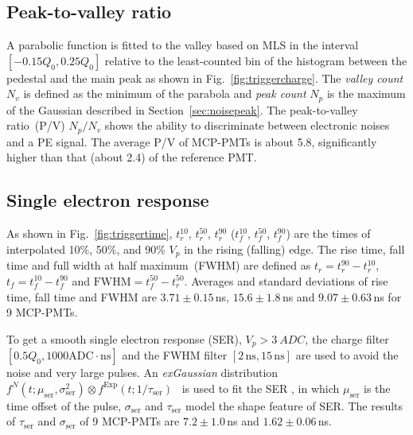 \subsection{Peak-to-valley ratio}
A parabolic function is fitted to the valley based on MLS in the interval $[-0.15Q_0, 0.25Q_0]$ relative to the least-counted bin of the histogram between the pedestal and the main peak as shown in Fig.~\ref{fig:triggercharge}. The \emph{valley count} $N_v$ is defined as the minimum of the parabola and \emph{peak count} $N_p$ is the maximum of the Gaussian described in Section~\ref{sec:noisepeak}. The peak-to-valley ratio~(P/V) ${N_p}/{N_v}$ shows the ability to discriminate between electronic noises and a PE signal. The average P/V of MCP-PMTs is about 5.8, significantly higher than that (about 2.4) of the reference PMT.

\subsection{Single electron response}
As shown in Fig.~\ref{fig:triggertime}, $t^{10}_r$, $t^{50}_r$, $t^{90}_r$ ($t^{10}_f$, $t^{50}_f$, $t^{90}_f$) are the times of interpolated 10\%, 50\%, and 90\% $V_p$ in the rising (falling) edge. The rise time, fall time and full width at half maximum~(FWHM) are defined as $t_r = t^{90}_r - t^{10}_r$, $t_f = t^{10}_f - t^{90}_f$ and $\mathrm{FWHM} = t^{50}_f - t^{50}_r$. Averages and standard deviations of rise time, fall time and FWHM are $3.71\pm0.15$\,ns, $15.6\pm1.8$\,ns and $9.07\pm0.63$\,ns for 9 MCP-PMTs.

To get a smooth single electron response (SER), $V_p>\SI{3}{ADC}$, the charge filter $[0.5Q_0, 1000\mathrm{ADC\cdot ns}]$ and the FWHM filter $[2\,\mathrm{ns}, 15\,\mathrm{ns}]$ are used to avoid the noise and very large pulses. An \emph{exGaussian} distribution $f^N(t;\mu_{\mathrm{ser}},\sigma_\mathrm{ser}^2)\otimes f^{\mathrm{Exp}}(t;1/\tau_\mathrm{ser})$~\cite{Luo:2022xrd} is used to fit the SER%
, in which $\mu_{\mathrm{ser}}$ is the time offset of the pulse, $\sigma_{\mathrm{ser}}$ and $\tau_{\mathrm{ser}}$ model the shape feature of SER. The results of $\tau_{\mathrm{ser}}$ and $\sigma_{\mathrm{ser}}$ of 9 MCP-PMTs are $7.2\pm1.0$\,ns and $1.62\pm0.06$\,ns.

